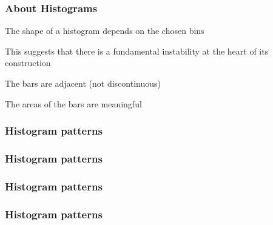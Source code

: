 \documentclass[12pt]{beamer}\usepackage[]{graphicx}\usepackage[]{color}
\begin{document}

\begin{frame}
\frametitle{About Histograms}

\bi
  \item The shape of a histogram depends on the chosen bins
  \item This suggests that there is a fundamental instability at the heart of its construction
  \item The bars are adjacent (not discontinuous)
  \item The areas of the bars are meaningful
\ei

\end{frame}


\begin{frame}
\frametitle{Histogram patterns}
\begin{center}
\end{center}
\end{frame}


\begin{frame}
\frametitle{Histogram patterns}
\begin{center}
\end{center}
\end{frame}


\begin{frame}
\frametitle{Histogram patterns}
\begin{center}
\end{center}
\end{frame}


\begin{frame}
\frametitle{Histogram patterns}
\begin{center}
\end{center}
\end{frame}


\begin{frame}
\begin{center}
\Huge{}
\end{center}
\end{frame}
\end{document}
